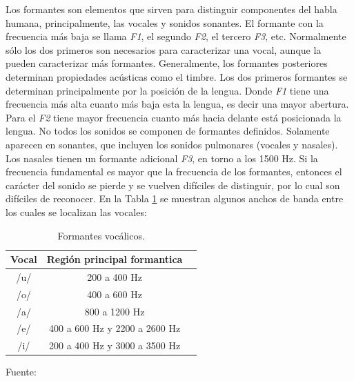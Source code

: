\begin{enumerate}
Los formantes son elementos que sirven para distinguir componentes del habla humana, principalmente, las vocales y sonidos sonantes. El formante con la frecuencia más baja se llama \textit{F1}, el segundo \textit{F2}, el tercero \textit{F3}, etc. Normalmente sólo los dos primeros son necesarios para caracterizar una vocal, aunque la pueden caracterizar más formantes. Generalmente, los formantes posteriores determinan propiedades acústicas como el timbre. Los dos primeros formantes se determinan principalmente por la posición de la lengua. Donde \textit{F1} tiene una frecuencia más alta cuanto más baja esta la lengua, es decir una mayor abertura. Para el \textit{F2} tiene mayor frecuencia cuanto más hacia delante está posicionada la lengua.
\vskip 0.5cm
No todos los sonidos se componen de formantes definidos. Solamente aparecen en sonantes, que incluyen los sonidos pulmonares (vocales y nasales). Los nasales tienen un formante adicional \textit{F3}, en torno a los 1500 Hz. Si la frecuencia fundamental es mayor que la frecuencia de los formantes, entonces el carácter del sonido se pierde y se vuelven difíciles de distinguir, por lo cual son difíciles de reconocer. En la Tabla \ref{table:tabla2.2} se muestran algunos anchos de banda entre los cuales se localizan las vocales:

\begin{center}
\begin{table}[h!]
\centering
\caption{\small{Formantes vocálicos.}}
\label{table:tabla2.2}
\vskip 0.2cm
\begin{tabular}{|c|c|c|}
\hline
{\small Vocal} & {\small Región principal formantica}\\ 
\hline 
{\small /u/} & {\small 200 a 400 Hz}\\ 
\hline 
{\small /o/} & {\small 400 a 600 Hz}\\ 
\hline 
{\small /a/} & {\small 800 a 1200 Hz}\\ 
\hline 
{\small /e/} & {\small 400 a 600 Hz y 2200 a 2600 Hz}\\ 
\hline 
{\small /i/} & {\small 200 a 400 Hz y 3000 a 3500 Hz}\\ 
\hline 
\end{tabular} 
\begin{center}
\vskip 0.2cm
{\small{Fuente: \cite{wikipedia1}}}
\end{center}
\end{table}
\end{center}


\end{enumerate}
